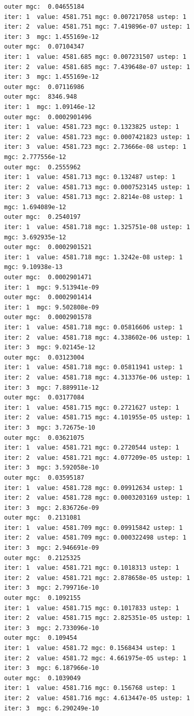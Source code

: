 \documentclass[
  letterpaper,
  DIV=11,
  numbers=noendperiod]{scrartcl}
\begin{document}
\begin{verbatim}
outer mgc:  0.04655184 
iter: 1  value: 4581.751 mgc: 0.007217058 ustep: 1 
iter: 2  value: 4581.751 mgc: 7.419896e-07 ustep: 1 
iter: 3  mgc: 1.455169e-12 
outer mgc:  0.07104347 
iter: 1  value: 4581.685 mgc: 0.007231507 ustep: 1 
iter: 2  value: 4581.685 mgc: 7.439648e-07 ustep: 1 
iter: 3  mgc: 1.455169e-12 
outer mgc:  0.07116986 
outer mgc:  8346.948 
iter: 1  mgc: 1.09146e-12 
outer mgc:  0.0002901496 
iter: 1  value: 4581.723 mgc: 0.1323825 ustep: 1 
iter: 2  value: 4581.723 mgc: 0.0007421823 ustep: 1 
iter: 3  value: 4581.723 mgc: 2.73666e-08 ustep: 1 
mgc: 2.777556e-12 
outer mgc:  0.2555962 
iter: 1  value: 4581.713 mgc: 0.132487 ustep: 1 
iter: 2  value: 4581.713 mgc: 0.0007523145 ustep: 1 
iter: 3  value: 4581.713 mgc: 2.8214e-08 ustep: 1 
mgc: 1.694089e-12 
outer mgc:  0.2540197 
iter: 1  value: 4581.718 mgc: 1.325751e-08 ustep: 1 
mgc: 3.692935e-12 
outer mgc:  0.0002901521 
iter: 1  value: 4581.718 mgc: 1.3242e-08 ustep: 1 
mgc: 9.10938e-13 
outer mgc:  0.0002901471 
iter: 1  mgc: 9.513941e-09 
outer mgc:  0.0002901414 
iter: 1  mgc: 9.502808e-09 
outer mgc:  0.0002901578 
iter: 1  value: 4581.718 mgc: 0.05816606 ustep: 1 
iter: 2  value: 4581.718 mgc: 4.338602e-06 ustep: 1 
iter: 3  mgc: 9.02145e-12 
outer mgc:  0.03123004 
iter: 1  value: 4581.718 mgc: 0.05811941 ustep: 1 
iter: 2  value: 4581.718 mgc: 4.313376e-06 ustep: 1 
iter: 3  mgc: 7.889911e-12 
outer mgc:  0.03177084 
iter: 1  value: 4581.715 mgc: 0.2721627 ustep: 1 
iter: 2  value: 4581.715 mgc: 4.101955e-05 ustep: 1 
iter: 3  mgc: 3.72675e-10 
outer mgc:  0.03621075 
iter: 1  value: 4581.721 mgc: 0.2720544 ustep: 1 
iter: 2  value: 4581.721 mgc: 4.077209e-05 ustep: 1 
iter: 3  mgc: 3.592058e-10 
outer mgc:  0.03595187 
iter: 1  value: 4581.728 mgc: 0.09912634 ustep: 1 
iter: 2  value: 4581.728 mgc: 0.0003203169 ustep: 1 
iter: 3  mgc: 2.836726e-09 
outer mgc:  0.2131081 
iter: 1  value: 4581.709 mgc: 0.09915842 ustep: 1 
iter: 2  value: 4581.709 mgc: 0.000322498 ustep: 1 
iter: 3  mgc: 2.946691e-09 
outer mgc:  0.2125325 
iter: 1  value: 4581.721 mgc: 0.1018313 ustep: 1 
iter: 2  value: 4581.721 mgc: 2.878658e-05 ustep: 1 
iter: 3  mgc: 2.799716e-10 
outer mgc:  0.1092155 
iter: 1  value: 4581.715 mgc: 0.1017833 ustep: 1 
iter: 2  value: 4581.715 mgc: 2.825351e-05 ustep: 1 
iter: 3  mgc: 2.733096e-10 
outer mgc:  0.109454 
iter: 1  value: 4581.72 mgc: 0.1568434 ustep: 1 
iter: 2  value: 4581.72 mgc: 4.661975e-05 ustep: 1 
iter: 3  mgc: 6.187966e-10 
outer mgc:  0.1039049 
iter: 1  value: 4581.716 mgc: 0.156768 ustep: 1 
iter: 2  value: 4581.716 mgc: 4.613447e-05 ustep: 1 
iter: 3  mgc: 6.290249e-10 

\end{verbatim}
\end{document}
